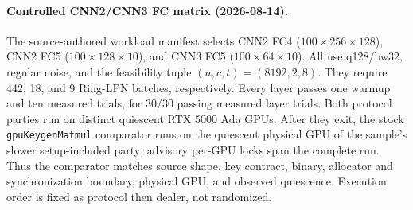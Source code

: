 \documentclass[11pt]{article}
\begin{document}
\paragraph{Controlled CNN2/CNN3 FC matrix (2026-08-14).}
The source-authored workload manifest selects CNN2 FC4
($100{\times}256{\times}128$), CNN2 FC5
($100{\times}128{\times}10$), and CNN3 FC5
($100{\times}64{\times}10$). All use q128/bw32, regular noise, and the
feasibility tuple $(n,c,t)=(8192,2,8)$. They require 442, 18, and 9 Ring-LPN
batches, respectively. Every layer passes one warmup and ten measured trials,
for 30/30 passing measured layer trials. Both protocol parties run on distinct
quiescent RTX 5000 Ada GPUs. After they exit, the stock
\texttt{gpuKeygenMatmul} comparator runs on the quiescent physical GPU of the
sample's slower setup-included party; advisory per-GPU locks span the complete
run. Thus the comparator matches source shape, key contract, binary, allocator
and synchronization boundary, physical GPU, and observed quiescence. Execution
order is fixed as protocol then dealer, not randomized.
\end{document}
